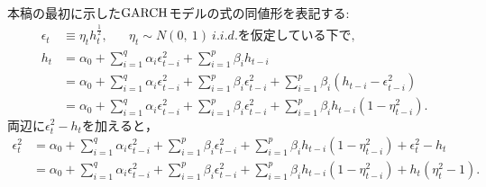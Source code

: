 \documentclass[8pt]{jsarticle}
\begin{document}
\begin{breakbox}
	{}\\
	本稿の最初に示した${\rm GARCH}$モデルの式の同値形を表記する:
	\begin{align*}
		\epsilon_t &\equiv \eta_t h_t^{\frac{1}{2}}, \hspace{20pt} \eta_t \sim N(0,\ 1)\ i.i.d. \mbox{を仮定している下で,}\\
		h_t &= \alpha_0 + \sum_{i=1}^{q} \alpha_i \epsilon_{t-i}^2 + \sum_{i=1}^{p} \beta_i h_{t-i} \\
		&= \alpha_0 + \sum_{i=1}^{q} \alpha_i \epsilon_{t-i}^2 + \sum_{i=1}^{p} \beta_i \epsilon_{t-i}^2 + \sum_{i=1}^{p} \beta_i (h_{t-i} - \epsilon_{t-i}^2) \\
		&= \alpha_0 + \sum_{i=1}^{q} \alpha_i \epsilon_{t-i}^2 + \sum_{i=1}^{p} \beta_i \epsilon_{t-i}^2 + \sum_{i=1}^{p} \beta_i h_{t-i}(1 - \eta_{t-i}^2).
	\end{align*}
	$両辺に \epsilon_t^2 - h_t を加えると，$
	\begin{align*}
		\epsilon_t^2 &= \alpha_0 + \sum_{i=1}^{q} \alpha_i \epsilon_{t-i}^2 + \sum_{i=1}^{p} \beta_i \epsilon_{t-i}^2 
			+ \sum_{i=1}^{p} \beta_i h_{t-i}(1 - \eta_{t-i}^2) + \epsilon_t^2 - h_t \\
		&= \alpha_0 + \sum_{i=1}^{q} \alpha_i \epsilon_{t-i}^2 + \sum_{i=1}^{p} \beta_i \epsilon_{t-i}^2 
			+ \sum_{i=1}^{p} \beta_i h_{t-i}(1 - \eta_{t-i}^2) + h_t(\eta_t^2 - 1).
	\end{align*}
\end{breakbox}
\end{document}

